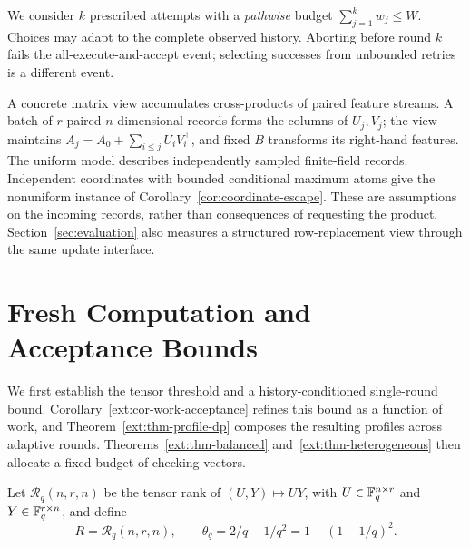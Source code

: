 We consider $k$ prescribed attempts with a \emph{pathwise} budget
$\sum_{j=1}^k w_j\le W$. Choices may adapt to the complete observed
history. Aborting before round $k$ fails the all-execute-and-accept event;
selecting successes from unbounded retries is a different event.

A concrete matrix view accumulates cross-products of paired feature
streams. A batch of $r$ paired $n$-dimensional records forms the columns
of $U_j,V_j$; the view maintains
$A_j=A_0+\sum_{i\le j}U_iV_i^\top$, and fixed $B$ transforms its right-hand
features. The uniform model describes independently sampled finite-field
records. Independent coordinates with bounded conditional maximum atoms
give the nonuniform instance of Corollary~\ref{cor:coordinate-escape}.
These are assumptions on the incoming records, rather than consequences
of requesting the product. Section~\ref{sec:evaluation} also measures a
structured row-replacement view through the same update interface.

\section{Fresh Computation and Acceptance Bounds}\label{sec:fresh-theory}
We first establish the tensor threshold and a history-conditioned
single-round bound. Corollary~\ref{ext:cor-work-acceptance} refines this
bound as a function of work, and Theorem~\ref{ext:thm-profile-dp} composes
the resulting profiles across adaptive rounds.
Theorems~\ref{ext:thm-balanced} and~\ref{ext:thm-heterogeneous} then allocate
a fixed budget of checking vectors.

Let $\mathcal R_q(n,r,n)$ be the tensor rank of
$(U,Y)\mapsto UY$, with $U\in\mathbb F_q^{n\times r}$ and
$Y\in\mathbb F_q^{r\times n}$, and define
\begin{equation}\label{eq:fresh-parameters}
R=\mathcal R_q(n,r,n),\qquad
\theta_q=2/q-1/q^2=1-(1-1/q)^2.
\end{equation}

